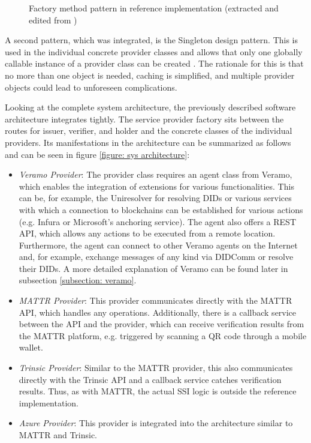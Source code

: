     \begin{figure}[ht]
	    \centering    	    \makebox[\textwidth]{}
        \caption{Factory method pattern in reference implementation (extracted and edited from \cite[p. 107]{gamma_design_1995})}
        \label{figure: factory method}
    \end{figure}
    
    A second pattern, which was integrated, is the Singleton design pattern. This is used in the individual concrete provider classes and allows that only one globally callable instance of a provider class can be created \cite[p. 127]{gamma_design_1995}. The rationale for this is that no more than one object is needed, caching is simplified, and multiple provider objects could lead to unforeseen complications.
    
    Looking at the complete system architecture, the previously described software architecture integrates tightly. The service provider factory sits between the routes for issuer, verifier, and holder and the concrete classes of the individual providers. Its manifestations in the architecture can be summarized as follows and can be seen in figure \ref{figure: sys architecture}:
    
    \begin{itemize}
        \item \textit{Veramo Provider}: The provider class requires an agent class from Veramo, which enables the integration of extensions for various functionalities. This can be, for example, the Uniresolver for resolving \acp{DID} or various services with which a connection to blockchains can be established for various actions (e.g. Infura or Microsoft's anchoring service). The agent also offers a REST API, which allows any actions to be executed from a remote location. Furthermore, the agent can connect to other Veramo agents on the Internet and, for example, exchange messages of any kind via DIDComm or resolve their \acp{DID}. A more detailed explanation of Veramo can be found later in subsection \ref{subsection: veramo}.
        \item \textit{MATTR Provider}: This provider communicates directly with the MATTR API, which handles any operations. Additionally, there is a callback service between the API and the provider, which can receive verification results from the MATTR platform, e.g. triggered by scanning a QR code through a mobile wallet.
        \item \textit{Trinsic Provider}: Similar to the MATTR provider, this also communicates directly with the Trinsic API and a callback service catches verification results. Thus, as with MATTR, the actual \ac{SSI} logic is outside the reference implementation.
        \item \textit{Azure Provider}: This provider is integrated into the architecture similar to MATTR and Trinsic. 
    \end{itemize}
    
